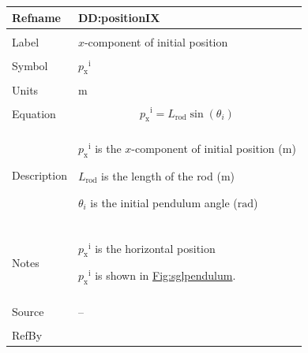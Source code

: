 \documentclass[12pt]{article}
\begin{document}
\vspace{\baselineskip}
\noindent
\begin{minipage}{\textwidth}
\begin{tabular}{>{\raggedright}p{}>{\raggedright\arraybackslash}p{}}
\toprule \textbf{Refname} & \textbf{DD:positionIX}
\label{DD:positionIX}
\\ \midrule \\
Label & $x$-component of initial position
        
\\ \midrule \\
Symbol & ${{p_{\text{x}}}^{\text{i}}}$
         
\\ \midrule \\
Units & ${\text{m}}$
        
\\ \midrule \\
Equation & \begin{displaymath}
           {{p_{\text{x}}}^{\text{i}}}={L_{\text{rod}}} \sin\left({θ_{i}}\right)
           \end{displaymath}
\\ \midrule \\
Description & \begin{symbDescription}
              \item{${{p_{\text{x}}}^{\text{i}}}$ is the $x$-component of initial position (${\text{m}}$)}
              \item{${L_{\text{rod}}}$ is the length of the rod (${\text{m}}$)}
              \item{${θ_{i}}$ is the initial pendulum angle (${\text{rad}}$)}
              \end{symbDescription}
\\ \midrule \\
Notes & ${{p_{\text{x}}}^{\text{i}}}$ is the horizontal position
        
        ${{p_{\text{x}}}^{\text{i}}}$ is shown in \hyperref[Figure:sglpendulum]{Fig:sglpendulum}.
        
\\ \midrule \\
Source & --
         
\\ \midrule \\
RefBy & 
\\ \bottomrule
\end{tabular}
\end{minipage}
\end{document}
